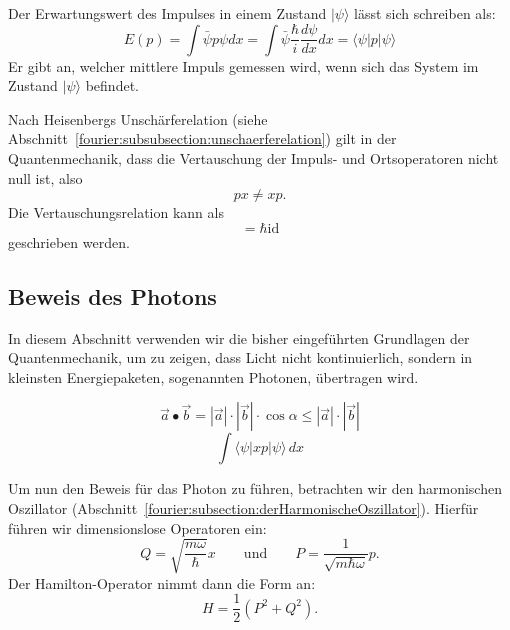 Der Erwartungswert des Impulses in einem Zustand $|\psi\rangle$ lässt sich schreiben als:
\begin{equation}
	E(p) = \int \bar{\psi}p\psi dx
	= \int \bar{\psi} \frac{\hbar}{i} \frac{d\psi}{dx} dx
	= \langle \psi | p | \psi \rangle
\end{equation}
Er gibt an, welcher mittlere Impuls gemessen wird, wenn sich das System im Zustand $|\psi\rangle$ befindet.

Nach Heisenbergs Unschärferelation (siehe Abschnitt~\ref{fourier:subsubsection:unschaerferelation}) gilt in der Quantenmechanik, dass die Vertauschung der Impuls- und Ortsoperatoren nicht null ist, also
\begin{equation}
	px \neq xp.
\end{equation}
Die Vertauschungsrelation kann als
\begin{equation}
	[x, p] = \hbar \text{id}
\end{equation}
geschrieben werden.

\subsection{Beweis des Photons\label{fourier:subsection:beweisPhoton}} %
In diesem Abschnitt verwenden wir die bisher eingeführten Grundlagen der Quantenmechanik, um zu zeigen, dass Licht nicht kontinuierlich, sondern in kleinsten Energiepaketen, sogenannten Photonen, übertragen wird.

\begin{equation}
	\vec{a}\bullet\vec{b} = |\vec{a}| \cdot |\vec{b}| \cdot \cos{\alpha} \leq |\vec{a}| \cdot |\vec{b}|
\end{equation}
\begin{equation}
	\int \langle \psi |xp|\psi \rangle\,dx	%
\end{equation}

Um nun den Beweis für das Photon zu führen, betrachten wir den harmonischen Oszillator (Abschnitt~\ref{fourier:subsection:derHarmonischeOszillator}).
Hierfür führen wir dimensionslose Operatoren ein:
\[ 
Q = \sqrt{\frac{m\omega}{\hbar}}x
\qquad\text{und}\qquad
P = \frac{1}{\sqrt{m\hbar\omega}}p.
\]
Der Hamilton-Operator nimmt dann die Form an:
\begin{equation}
	H = \frac{1}{2}(P^2 + Q^2).
\end{equation}


